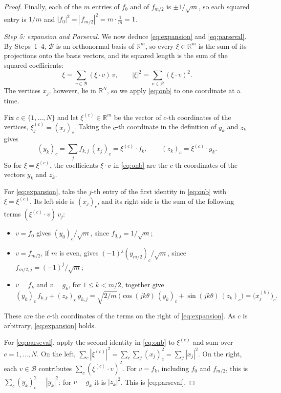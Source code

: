 \begin{proof}
  Finally, each of the $m$ entries of $f_{0}$ and of $f_{m/2}$ is
  $\pm 1/\sqrt{m}$, so each squared entry is $1/m$ and
  $|f_{0}|^{2} = |f_{m/2}|^{2} = m \cdot \frac1m = 1$.

  \emph{Step 5: expansion and Parseval.} We now deduce
  \eqref{eq:expansion} and \eqref{eq:parseval}. By Steps~1--4,
  $\mathcal{B}$ is an orthonormal basis of $\mathbb{R}^{m}$, so every
  $\xi \in \mathbb{R}^{m}$ is the sum of its projections onto the basis
  vectors, and its squared length is the sum of the squared coefficients:
  \begin{equation}
    \label{eq:onb}
    \xi = \sum_{v \in \mathcal{B}} (\xi \cdot v)\, v,
    \qquad
    |\xi|^{2} = \sum_{v \in \mathcal{B}} (\xi \cdot v)^{2}.
  \end{equation}
  The vertices $x_{j}$, however, lie in $\mathbb{R}^{N}$, so we apply
  \eqref{eq:onb} to one coordinate at a time.

  Fix $c \in \{1, \ldots, N\}$ and let $\xi^{(c)} \in \mathbb{R}^{m}$ be the
  vector of $c$-th coordinates of the vertices, $\xi^{(c)}_{j} =
  (x_{j})_{c}$. Taking the $c$-th coordinate in the definition of $y_{k}$
  and $z_{k}$ gives
  \[
    (y_{k})_{c} = \sum_{j} f_{k,j}\, (x_{j})_{c} = \xi^{(c)} \cdot f_{k},
    \qquad
    (z_{k})_{c} = \xi^{(c)} \cdot g_{k}.
  \]
  So for $\xi = \xi^{(c)}$, the coefficients $\xi \cdot v$ in
  \eqref{eq:onb} are the $c$-th coordinates of the vectors $y_{k}$ and
  $z_{k}$.

  For \eqref{eq:expansion}, take the $j$-th entry of the first identity in
  \eqref{eq:onb} with $\xi = \xi^{(c)}$. Its left side is $(x_{j})_{c}$,
  and its right side is the sum of the following terms
  $(\xi^{(c)} \cdot v)\, v_{j}$:
  \begin{itemize}
    \item $v = f_{0}$ gives $(y_{0})_{c}/\sqrt{m}$, since
      $f_{0,j} = 1/\sqrt{m}$;
    \item $v = f_{m/2}$, if $m$ is even, gives
      $(-1)^{j} (y_{m/2})_{c}/\sqrt{m}$, since
      $f_{m/2,j} = (-1)^{j}/\sqrt{m}$;
    \item $v = f_{k}$ and $v = g_{k}$, for $1 \leq k < m/2$, together give
      \[
        (y_{k})_{c}\, f_{k,j} + (z_{k})_{c}\, g_{k,j}
          = \sqrt{2/m}\,\bigl(\cos(jk\theta)\, (y_{k})_{c}
            + \sin(jk\theta)\, (z_{k})_{c}\bigr)
          = \bigl(x^{(k)}_{j}\bigr)_{c}.
      \]
  \end{itemize}
  These are the $c$-th coordinates of the terms on the right of
  \eqref{eq:expansion}. As $c$ is arbitrary, \eqref{eq:expansion} holds.

  For \eqref{eq:parseval}, apply the second identity in \eqref{eq:onb} to
  $\xi^{(c)}$ and sum over $c = 1, \ldots, N$. On the left,
  $\sum_{c} |\xi^{(c)}|^{2} = \sum_{c} \sum_{j} (x_{j})_{c}^{2}
  = \sum_{j} |x_{j}|^{2}$. On the right, each $v \in \mathcal{B}$
  contributes $\sum_{c} (\xi^{(c)} \cdot v)^{2}$. For $v = f_{k}$,
  including $f_{0}$ and $f_{m/2}$, this is
  $\sum_{c} (y_{k})_{c}^{2} = |y_{k}|^{2}$; for $v = g_{k}$ it is
  $|z_{k}|^{2}$. This is \eqref{eq:parseval}.
\end{proof}

